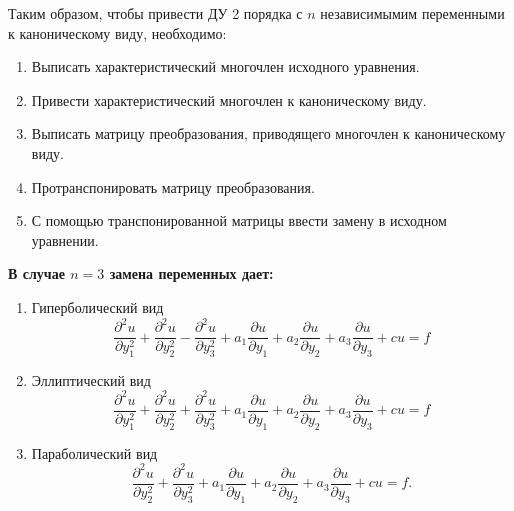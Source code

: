 \documentclass[../main.tex]{subfiles}
\begin{document}
Таким образом, чтобы привести ДУ 2 порядка с $n$ независимымим переменными к каноническому виду, необходимо:
\begin{enumerate}
    \item Выписать характеристический многочлен исходного уравнения.
    \item Привести характеристический многочлен к каноническому виду.
    \item Выписать матрицу преобразования, приводящего многочлен к каноническому виду.
    \item Протранспонировать матрицу преобразования.
    \item С помощью транспонированной матрицы ввести замену в исходном уравнении.
\end{enumerate}
{\bf В случае $n=3$ замена переменных дает:
\begin{enumerate}
    \item Гиперболический вид
    $$\frac{\partial^2 u }{\partial y_1 ^2} + \frac{\partial^2 u}{\partial y_2^2} - \frac{\partial^2 u}{\partial y_3^2} + a_1 \frac{\partial u}{\partial y_1} + a_2 \frac{\partial u}{\partial y_2} + a_3 \frac{\partial u}{\partial y_3} + cu = f$$ 
    \item Эллиптический вид
    $$\frac{\partial^2 u }{\partial y_1 ^2} + \frac{\partial^2 u}{\partial y_2^2} + \frac{\partial^2 u}{\partial y_3^2} + a_1 \frac{\partial u}{\partial y_1} + a_2 \frac{\partial u}{\partial y_2} + a_3 \frac{\partial u}{\partial y_3} + cu = f$$ 
    \item Параболический вид
    $$\frac{\partial^2 u}{\partial y_2^2} + \frac{\partial^2 u}{\partial y_3^2} + a_1 \frac{\partial u}{\partial y_1} + a_2 \frac{\partial u}{\partial y_2} + a_3 \frac{\partial u}{\partial y_3} + cu = f.$$
\end{enumerate}}
\end{document}
